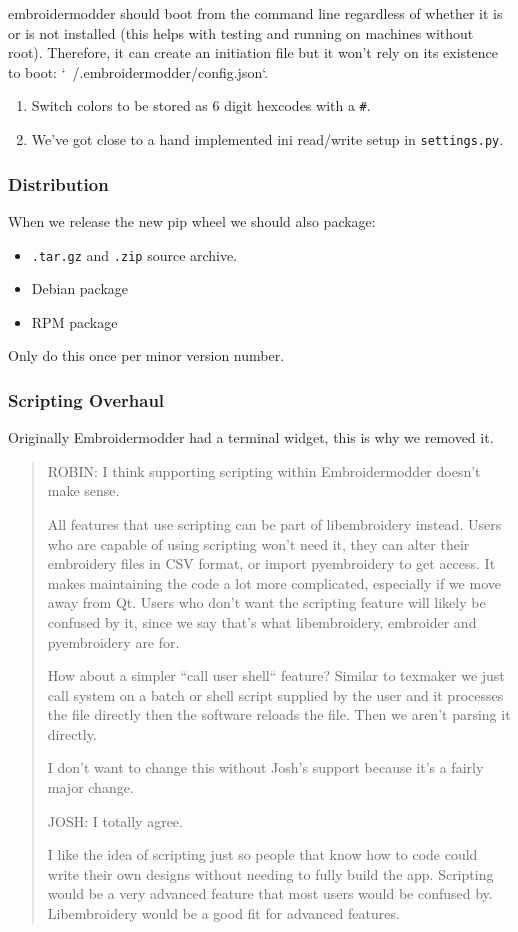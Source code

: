 \documentclass[a4paper, 11pt]{report}
\begin{document}
embroidermodder should boot from the command line
regardless of whether it is or is not installed (this helps with testing and
running on machines without root). Therefore, it can create an initiation file
but it won't rely on its existence to boot: `~/.embroidermodder/config.json`.

\begin{enumerate}
\item Switch colors to be stored as 6 digit hexcodes with a \texttt{\#}.
\item We've got close to a hand implemented ini read/write setup in \texttt{settings.py}.
\end{enumerate}

\subsubsection{Distribution}

When we release the new pip wheel we should also package:

\begin{itemize}
\item \texttt{.tar.gz} and \texttt{.zip} source archive.
\item Debian package
\item RPM package
\end{itemize}

Only do this once per minor version number.

\subsubsection{Scripting Overhaul}

Originally Embroidermodder had a terminal widget, this is why we removed it.

\begin{quote}
ROBIN: I think supporting scripting within Embroidermodder doesn't make sense.

All features that use scripting can be part of libembroidery instead.
Users who are capable of using scripting won't need it, they can alter their embroidery files in CSV format, or import pyembroidery to get access.
It makes maintaining the code a lot more complicated, especially if we move away from Qt.
Users who don't want the scripting feature will likely be confused by it, since we say that's what libembroidery, embroider and pyembroidery are for.

How about a simpler ``call user shell`` feature? Similar to texmaker we just call system on a batch or shell script supplied by the user and it processes the file directly then the software reloads the file. Then we aren't parsing it directly.

I don't want to change this without Josh's support because it's a fairly major change.

JOSH: I totally agree.

I like the idea of scripting just so people that know how to code could write their own designs without needing to fully build the app. Scripting would be a very advanced feature that most users would be confused by. Libembroidery would be a good fit for advanced features.
\end{quote}
\end{document}
